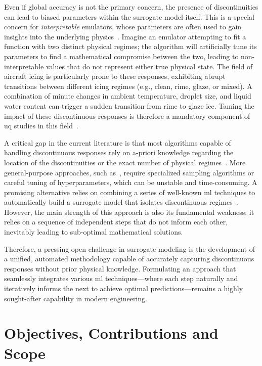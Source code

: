 \smallskip
Even if global accuracy is not the primary concern, the presence of discontinuities can lead to biased parameters within the surrogate model itself. This is a special concern for \textit{interpretable} emulators, whose parameters are often used to gain insights into the underlying physics~\cite{Palar2024}. Imagine an emulator attempting to fit a function with two distinct physical regimes; the algorithm will artificially tune its parameters to find a mathematical compromise between the two, leading to non-interpretable values that do not represent either true physical state. The field of aircraft icing is particularly prone to these responses, exhibiting abrupt transitions between different icing regimes (e.g., clean, rime, glaze, or mixed). A combination of minute changes in ambient temperature, droplet size, and liquid water content can trigger a sudden transition from rime to glaze ice. Taming the impact of these discontinuous responses is therefore a mandatory component of \gls{uq} studies in this field~\cite{Gori2022, GoriGallia2024}.

\smallskip
A critical gap in the current literature is that most algorithms capable of handling discontinuous responses rely on a-priori knowledge regarding the location of the discontinuities or the exact number of physical regimes~\cite{GoriGallia2024}. More general-purpose approaches, such as~\cite{GPmixture}, require specialized sampling algorithms or careful tuning of hyperparameters, which can be unstable and time-consuming. A promising alternative relies on combining a series of well-known \gls{ml} techniques to automatically build a surrogate model that isolates discontinuous regimes~\cite{Sudret2023, Palar2024}. However, the main strength of this approach is also its fundamental weakness: it relies on a sequence of independent steps that do not inform each other, inevitably leading to sub-optimal mathematical solutions. 

\smallskip
Therefore, a pressing open challenge in surrogate modeling is the development of a unified, automated methodology capable of accurately capturing discontinuous responses without prior physical knowledge. Formulating an approach that seamlessly integrates various \gls{ml} techniques—where each step naturally and iteratively informs the next to achieve optimal predictions—remains a highly sought-after capability in modern engineering.

\section{Objectives, Contributions and Scope}
\label{sec:objectives}

